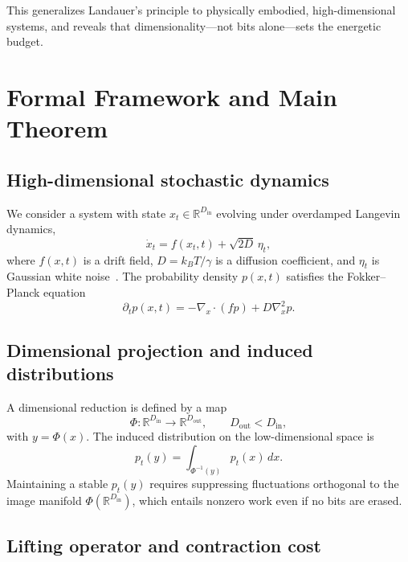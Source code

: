 \documentclass[12pt]{article}
\begin{document}
This generalizes Landauer's principle to physically embodied, high-dimensional systems, and reveals that dimensionality---not bits alone---sets the energetic budget.

\section{Formal Framework and Main Theorem}

\subsection{High-dimensional stochastic dynamics}

We consider a system with state $x_t \in \mathbb{R}^{D_\mathrm{in}}$ evolving under overdamped Langevin dynamics,
\begin{equation}
\dot{x}_t = f(x_t,t) + \sqrt{2D}\,\eta_t,
\label{eq:langevin}
\end{equation}
where $f(x,t)$ is a drift field, $D = k_B T / \gamma$ is a diffusion coefficient, and $\eta_t$ is Gaussian white noise~\citep{seifert2012}. The probability density $p(x,t)$ satisfies the Fokker--Planck equation
\begin{equation}
\partial_t p(x,t) = -\nabla_x \cdot (f p) + D \nabla_x^2 p.
\end{equation}

\subsection{Dimensional projection and induced distributions}

A dimensional reduction is defined by a map
\begin{equation}
\Phi: \mathbb{R}^{D_\mathrm{in}} \to \mathbb{R}^{D_\mathrm{out}},\qquad D_\mathrm{out} < D_\mathrm{in},
\end{equation}
with $y = \Phi(x)$. The induced distribution on the low-dimensional space is
\begin{equation}
p_t(y) = \int_{\Phi^{-1}(y)} p_t(x)\, dx.
\end{equation}
Maintaining a stable $p_t(y)$ requires suppressing fluctuations orthogonal to the image manifold $\Phi(\mathbb{R}^{D_\mathrm{in}})$, which entails nonzero work even if no bits are erased.

\subsection{Lifting operator and contraction cost}
\end{document}
